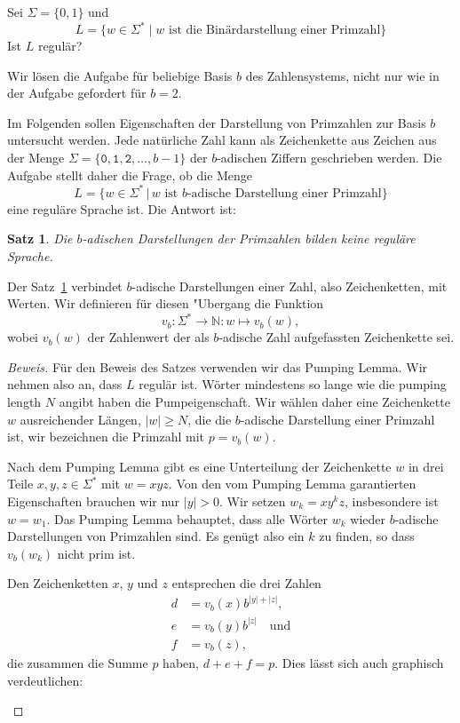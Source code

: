 Sei $\Sigma=\{0,1\}$ und 
\[
L=\{ w\in\Sigma^*\mid \text{$w$ ist die Binärdarstellung einer Primzahl}\}
\]
Ist $L$ regulär?


\begin{loesung}
Wir lösen die Aufgabe für beliebige Basis $b$ des Zahlensystems, nicht
nur wie in der Aufgabe gefordert für $b=2$.

Im Folgenden sollen Eigenschaften der Darstellung von Primzahlen
zur Basis $b$ untersucht werden.
Jede natürliche Zahl kann als Zeichenkette aus Zeichen aus der
Menge $\Sigma=\{\texttt{0},\texttt{1},\texttt{2},\dots, b-1\}$ der $b$-adischen
Ziffern geschrieben werden.
Die Aufgabe stellt daher die Frage, ob die Menge
\[
L=\{ w\in\Sigma^*\,|\,\text{$w$ ist $b$-adische Darstellung einer Primzahl}\}
\]
eine reguläre Sprache ist.
Die Antwort ist:

\newtheorem{satz}{Satz}

\begin{satz}
\label{30000051:satz}
Die $b$-adischen Darstellungen der Primzahlen bilden keine reguläre Sprache.
\end{satz}

Der Satz~\ref{30000051:satz} verbindet $b$-adische Darstellungen einer Zahl,
also Zeichenketten, mit Werten. 
Wir definieren für diesen "Ubergang die Funktion
\[
v_b\colon \Sigma^*\to \mathbb N:w\mapsto v_b(w),
\]
wobei $v_b(w)$ der Zahlenwert der als $b$-adische Zahl aufgefassten
Zeichenkette sei.

\begin{proof}[Beweis]
Für den Beweis des Satzes verwenden wir das Pumping Lemma.
Wir nehmen also an, dass $L$ regulär ist.
Wörter mindestens so lange wie die pumping length $N$ angibt haben
die Pump\-eigenschaft.
Wir wählen daher eine Zeichenkette $w$ ausreichender Längen, $|w|\ge N$,
die die $b$-adische Darstellung einer Primzahl ist, wir bezeichnen
die Primzahl mit $p=v_b(w)$.

Nach dem Pumping Lemma gibt es eine Unterteilung der Zeichenkette $w$ in
drei Teile $x,y,z\in\Sigma^*$ mit $w=xyz$.
Von den vom Pumping Lemma garantierten Eigenschaften brauchen wir nur
$|y|>0$.
Wir setzen $w_k=xy^kz$, insbesondere ist $w=w_1$.
Das Pumping Lemma behauptet, dass alle Wörter $w_k$ wieder $b$-adische 
Darstellungen von Primzahlen sind.
Es genügt also ein $k$ zu finden, so dass $v_b(w_k)$ nicht prim ist.

Den Zeichenketten $x$, $y$ und $z$ entsprechen die drei Zahlen
\begin{align*}
d&= v_b(x) b^{|y| + |z|},
\\
e&= v_b(y) b^{|z|} \quad\text{und}
\\
f&= v_b(z),
\end{align*}
die zusammen die Summe $p$ haben, $d+e+f=p$.
Dies lässt sich auch graphisch verdeutlichen:
\begin{center}
\def\u{0.5}
\pgfmathparse{1.5*\u}
\xdef\v{\pgfmathresult}
\begin{tikzpicture}[>=latex,thick]


\end{tikzpicture}
\end{center}
\end{proof}
\end{loesung}
